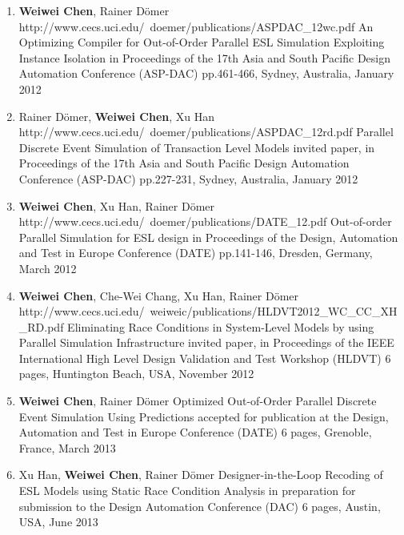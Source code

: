 \begin{enumerate}
\item
	\mypubhl
	{\textbf{Weiwei Chen}, Rainer D\"{o}mer}
	{http://www.cecs.uci.edu/~doemer/publications/ASPDAC_12wc.pdf}
	{An Optimizing Compiler for Out-of-Order Parallel ESL Simulation Exploiting Instance Isolation}
	{in Proceedings of }
	{the 17th Asia and South Pacific Design Automation Conference (ASP-DAC)}
	{pp.461-466, Sydney, Australia, January 2012}
	
	
\item
	\mypubhl
	{Rainer D\"{o}mer, \textbf{Weiwei Chen}, Xu Han}
	{http://www.cecs.uci.edu/~doemer/publications/ASPDAC_12rd.pdf}
	{Parallel Discrete Event Simulation of Transaction Level Models}
	{invited paper, in Proceedings of }
	{the 17th Asia and South Pacific Design Automation Conference (ASP-DAC)}
	{pp.227-231, Sydney, Australia, January 2012}
	
	
\item
	\mypubhl
	{\textbf{Weiwei Chen}, Xu Han, Rainer D\"{o}mer}
	{http://www.cecs.uci.edu/~doemer/publications/DATE_12.pdf}
	{Out-of-order Parallel Simulation for ESL design}
	{in Proceedings of }
	{the Design, Automation and Test in Europe Conference (DATE)}
	{pp.141-146, Dresden, Germany, March 2012}
	
\item
	\mypubhl
	{\textbf{Weiwei Chen}, Che-Wei Chang, Xu Han, Rainer D\"{o}mer}
	{http://www.cecs.uci.edu/~weiweic/publications/HLDVT2012_WC_CC_XH_RD.pdf}
	{Eliminating Race Conditions in System-Level Models by using Parallel Simulation Infrastructure} 
	{invited paper, in Proceedings of }
	{the IEEE International High Level Design Validation and Test Workshop (HLDVT)}
	{6 pages, Huntington Beach, USA, November 2012}
	
	
\item
	\mypub
	{\textbf{Weiwei Chen}, Rainer D\"{o}mer} 
	{Optimized Out-of-Order Parallel Discrete Event Simulation Using Predictions}
	{accepted for publication at }
	{the Design, Automation and Test in Europe Conference  (DATE)}
	{6 pages, Grenoble, France, March 2013}
	
	
\item
	\mypub
	{Xu Han, \textbf{Weiwei Chen}, Rainer D\"{o}mer}
	{Designer-in-the-Loop Recoding of ESL Models using Static Race Condition Analysis}
	{in preparation for submission to }
	{the Design Automation Conference (DAC)}
	{6 pages, Austin, USA, June 2013}
\end{enumerate}




